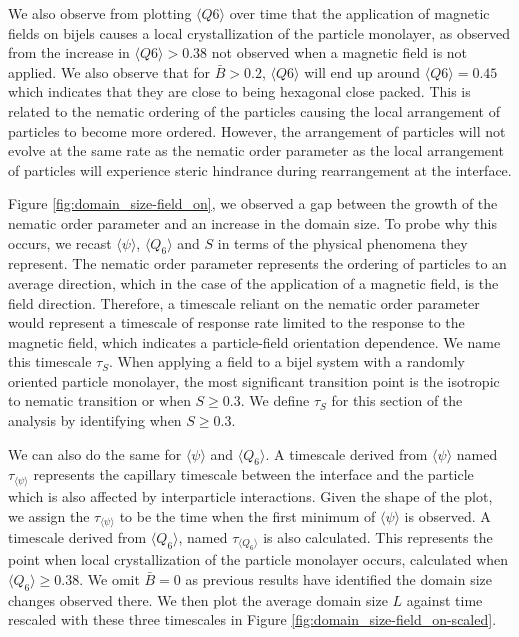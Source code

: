 We also observe from plotting $\langle Q6 \rangle$ over time that the application of magnetic fields on bijels causes a 
local crystallization of the particle monolayer, as observed from the increase in $\langle Q6 \rangle > 0.38$ not 
observed when a magnetic field is not applied. We also observe that for $\bar{B} > 0.2$, $\langle Q6 \rangle$ will 
end up around $\langle Q6 \rangle = 0.45$ which indicates that they are close to being hexagonal close packed. 
This is related to the nematic ordering of the particles causing the local arrangement of particles to become 
more ordered. However, the arrangement of particles will not evolve at the same rate as the nematic order parameter 
as the local arrangement of particles will experience steric hindrance during rearrangement at the interface. 

Figure \ref{fig:domain_size-field_on}, we observed a gap between the growth of the nematic order parameter and an 
increase in the domain size. To probe why this occurs, we recast $\langle \psi \rangle$, $\langle Q_6 \rangle$ and 
$S$ in terms of the physical phenomena they represent. The nematic order parameter represents the ordering of 
particles to an average direction, which in the case of the application of a magnetic field, is the field direction. 
Therefore, a timescale reliant on the nematic order parameter would represent a timescale of response rate limited 
to the response to the magnetic field, which indicates a particle-field orientation dependence. We name this 
timescale $\tau_S$. When applying a field to a bijel system with a randomly oriented particle monolayer, the 
most significant transition point is the isotropic to nematic transition or when $S \geq 0.3$. We define $\tau_S$ 
for this section of the analysis by identifying when $S \geq 0.3$.

We can also do the same for $\langle \psi \rangle$ and $\langle Q_6 \rangle$. A timescale derived from 
$\langle \psi \rangle$ named $\tau_{\langle \psi \rangle}$ represents the capillary timescale between the 
interface and the particle which is also affected by interparticle interactions. Given the shape of the plot,
we assign the $\tau_{\langle \psi \rangle}$ to be the time when the first minimum of $\langle \psi \rangle$ is 
observed. A timescale derived from $\langle Q_6 \rangle$, named $\tau_{\langle Q_6 \rangle}$ is also calculated. 
This represents the point when local crystallization of the particle monolayer occurs, calculated when 
$\langle Q_6 \rangle \geq 0.38$. We omit $\bar{B} = 0$ as previous results have identified the domain size 
changes observed there. We then plot the average domain size $L$ against time rescaled with these three 
timescales in Figure \ref{fig:domain_size-field_on-scaled}.


